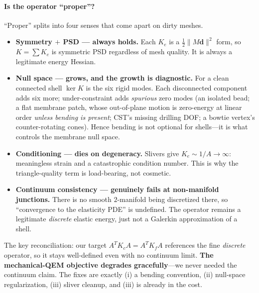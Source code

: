 \paragraph{Is the operator ``proper''?}
``Proper'' splits into four senses that come apart on dirty meshes.
\begin{itemize}
  \item \textbf{Symmetry $+$ PSD --- always holds.}
        Each $K_e$ is a $\tfrac12\|M\mathbf{d}\|^2$ form, so $K=\sum K_e$ is symmetric PSD regardless of mesh quality.
        It is always a legitimate energy Hessian.
  \item \textbf{Null space --- grows, and the growth is diagnostic.}
        For a clean connected shell $\ker K$ is the six rigid modes.
        Each disconnected component adds six more; under-constraint adds \emph{spurious} zero modes (an isolated bead; a flat membrane patch, whose out-of-plane motion is zero-energy at linear order \emph{unless bending is present}; CST's missing drilling DOF; a bowtie vertex's counter-rotating cones).
        Hence bending is not optional for shells---it is what controls the membrane null space.
  \item \textbf{Conditioning --- dies on degeneracy.}
        Slivers give $K_e \sim 1/A \to \infty$: meaningless strain and a catastrophic condition number.
        This is why the triangle-quality term is load-bearing, not cosmetic.
  \item \textbf{Continuum consistency --- genuinely fails at non-manifold junctions.}
        There is no smooth $2$-manifold being discretized there, so ``convergence to the elasticity PDE'' is undefined.
        The operator remains a legitimate \emph{discrete} elastic energy, just not a Galerkin approximation of a shell.
\end{itemize}
The key reconciliation: our target $A^T K_c A = A^T K_f A$ references the fine \emph{discrete} operator, so it stays well-defined even with no continuum limit.
\textbf{The mechanical-QEM objective degrades gracefully}---we never needed the continuum claim.
The fixes are exactly (i) a bending convention, (ii) null-space regularization, (iii) sliver cleanup, and (iii) is already in the cost.

